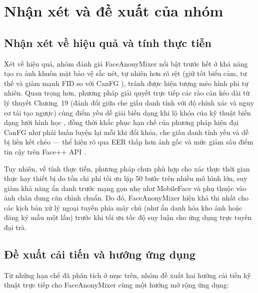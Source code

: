 \documentclass[oneside,a4paper,12pt]{extarticle}
\begin{document}
\section{Nhận xét và đề xuất của nhóm}
\label{sec::de-xuat-cai-tien}

\subsection{Nhận xét về hiệu quả và tính thực tiễn}
Xét về hiệu quả, nhóm đánh giá FaceAnonyMixer \cite{alam2025} nổi bật trước hết ở khả năng tạo ra ảnh khuôn mặt bảo vệ sắc nét, tự nhiên hơn rõ rệt (giữ tốt biểu cảm, tư thế và giảm mạnh FID so với CanFG \cite{wang2024canfg}), tránh được hiện tượng méo hình phi tự nhiên. Quan trọng hơn, phương pháp giải quyết trực tiếp các rào cản kéo dài từ lý thuyết Chương~19 \cite{adler2008} (đánh đổi giữa che giấu danh tính với độ chính xác và nguy cơ tái tạo ngược) cùng điểm yếu dễ giải biến dạng khi lộ khóa của kỹ thuật biến dạng lưới hình học \cite{ratha2001}, đồng thời khắc phục hạn chế của phương pháp hiện đại CanFG như phải huấn luyện lại mỗi khi đổi khóa, che giấu danh tính yếu và dễ bị liên kết chéo --- thể hiện rõ qua EER thấp hơn ảnh gốc và mức giảm sâu điểm tin cậy trên Face++ API \cite{facepp2024}.

Tuy nhiên, về tính thực tiễn, phương pháp chưa phù hợp cho xác thực thời gian thực hay thiết bị do tốn chi phí tối ưu lặp 50 bước trên nhiều mô hình lớn, suy giảm khả năng ẩn danh trước mạng gọn nhẹ như MobileFace và phụ thuộc vào ảnh chân dung căn chỉnh chuẩn. Do đó, FaceAnonyMixer hiện khả thi nhất cho các kịch bản xử lý ngoại tuyến phía máy chủ (như ẩn danh hóa kho ảnh hoặc đăng ký mẫu một lần) trước khi tối ưu tốc độ suy luận cho ứng dụng trực tuyến đại trà.

\subsection{Đề xuất cải tiến và hướng ứng dụng}
Từ những hạn chế đã phân tích ở mục trên, nhóm đề xuất hai hướng cải tiến kỹ thuật trực tiếp cho FaceAnonyMixer cùng một hướng mở rộng ứng dụng:
\end{document}
